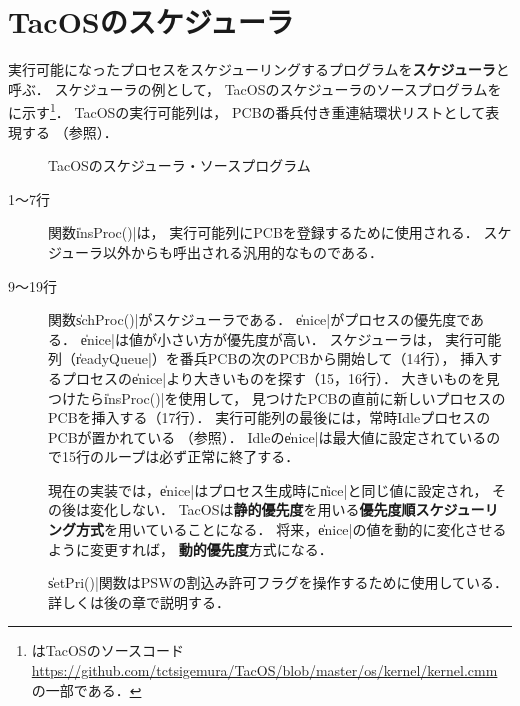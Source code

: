 \section{TacOSのスケジューラ}
実行可能になったプロセスをスケジューリングするプログラムを{\bf スケジューラ}と呼ぶ．
スケジューラの例として，
TacOSのスケジューラのソースプログラムをに示す\footnote{
はTacOSのソースコード
\url{https://github.com/tctsigemura/TacOS/blob/master/os/kernel/kernel.cmm}
の一部である．}．
TacOSの実行可能列は，
PCBの番兵付き重連結環状リストとして表現する
（参照）．

\begin{figure}[btp]

\caption{TacOSのスケジューラ・ソースプログラム}
\label{fig:tacosSch}
\end{figure}

\begin{description}
\item[1〜7行] 関数\|insProc()|は，
実行可能列にPCBを登録するために使用される．
スケジューラ以外からも呼出される汎用的なものである．

\item[9〜19行] 関数\|schProc()|がスケジューラである．
\|enice|がプロセスの優先度である．
\|enice|は値が小さい方が優先度が高い．
スケジューラは，
実行可能列（\|readyQueue|）を番兵PCBの次のPCBから開始して（14行），
挿入するプロセスの\|enice|より大きいものを探す（15，16行）．
大きいものを見つけたら\|insProc()|を使用して，
見つけたPCBの直前に新しいプロセスのPCBを挿入する（17行）．
実行可能列の最後には，常時IdleプロセスのPCBが置かれている
（参照）．
Idleの\|enice|は最大値に設定されているので15行のループは必ず正常に終了する．

現在の実装では，\|enice|はプロセス生成時に\|nice|と同じ値に設定され，
その後は変化しない．
TacOSは{\bf 静的優先度}を用いる{\bf 優先度順スケジューリング方式}を用いていることになる．
将来，\|enice|の値を動的に変化させるように変更すれば，
{\bf 動的優先度}方式になる．

\|setPri()|関数はPSWの割込み許可フラグを操作するために使用している．
詳しくは後の章で説明する．
\end{description}
